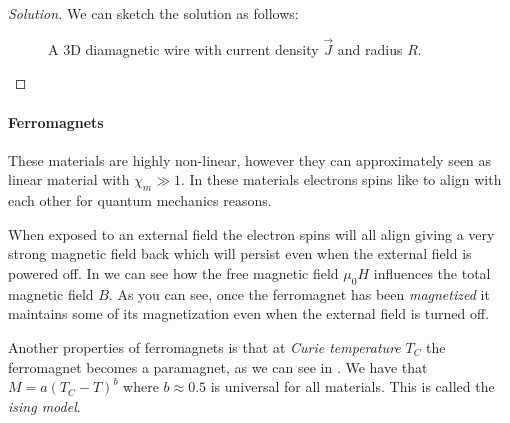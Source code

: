 \documentclass[12pt]{extarticle}
\begin{document}
\begin{proof}[Solution]
	We can sketch the solution as follows:
	\begin{figure}[H]
		\centering
		
		\caption{A 3D diamagnetic wire with current density $\vec J$ and radius $R$. }
	\end{figure}
\end{proof}

\paragraph{Ferromagnets}
These materials are highly non-linear, however they can approximately seen as linear material with $\chi_m \gg 1$.
In these materials electrons spins like to align with each other for quantum mechanics reasons.

When exposed to an external field the electron spins will all align giving a very strong magnetic field back
which will persist even when the external field is powered off.
In  we can see how the free magnetic field $\mu_0 H$ influences the total magnetic field $B$.
As you can see, once the ferromagnet has been \emph{magnetized} it maintains some of its magnetization
even when the external field is turned off.

Another properties of ferromagnets is that at \emph{Curie temperature} $T_C$ the ferromagnet becomes a paramagnet,
as we can see in .
We have that $M = a(T_C-T)^b$ where $b \approx 0.5$ is universal for all materials.
This is called the \emph{ising model}.
\end{document}
